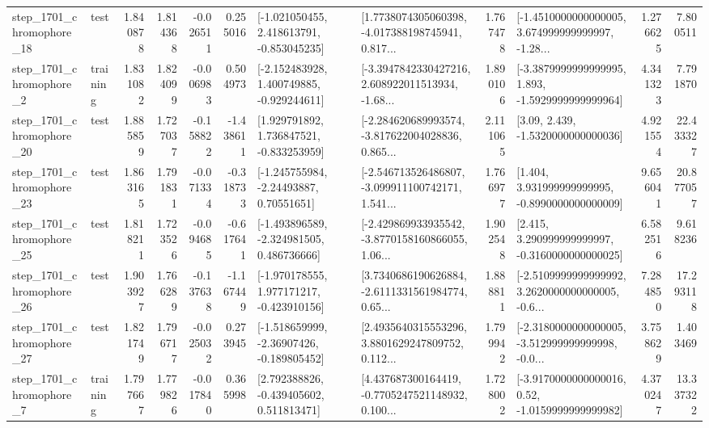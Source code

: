 \begin{tabular}{llrrrrllrlrr}
 step\_1701\_chromophore\_18 &      test &      1.840878 &    1.814368 &     -0.026511 &  0.255016 &   [-1.021050455, 2.418613791, -0.853045235] &  [1.7738074305060398, -4.017388198745941, 0.817... &       1.767478 &  [-1.4510000000000005, 3.674999999999997, -1.28... &            1.276625 &          7.800511 \\
  step\_1701\_chromophore\_2 &  training &      1.831082 &    1.824099 &     -0.006983 &  0.504973 &   [-2.152483928, 1.400749885, -0.929244611] &  [-3.3947842330427216, 2.608922011513934, -1.68... &       1.890106 &  [-3.3879999999999995, 1.893, -1.5929999999999964] &            4.341323 &          7.791870 \\
 step\_1701\_chromophore\_20 &      test &      1.885859 &    1.727037 &     -0.158822 & -1.438611 &    [1.929791892, 1.736847521, -0.833253959] &  [-2.284620689993574, -3.817622004028836, 0.865... &       2.111065 &                 [3.09, 2.439, -1.5320000000000036] &            4.921554 &         22.433327 \\
 step\_1701\_chromophore\_23 &      test &      1.863165 &    1.791831 &     -0.071334 & -0.318733 &     [-1.245755984, -2.24493887, 0.70551651] &  [-2.546713526486807, -3.099911100742171, 1.541... &       1.766977 &    [1.404, 3.931999999999995, -0.8990000000000009] &            9.656041 &         20.877057 \\
 step\_1701\_chromophore\_25 &      test &      1.818211 &    1.723526 &     -0.094685 & -0.617641 &   [-1.493896589, -2.324981505, 0.486736666] &  [-2.429869933935542, -3.8770158160866055, 1.06... &       1.902548 &    [2.415, 3.290999999999997, -0.3160000000000025] &            6.582516 &          9.618236 \\
 step\_1701\_chromophore\_26 &      test &      1.903927 &    1.766289 &     -0.137638 & -1.167449 &   [-1.970178555, 1.977171217, -0.423910156] &  [3.7340686190626884, -2.6111331561984774, 0.65... &       1.888811 &  [-2.5109999999999992, 3.2620000000000005, -0.6... &            7.284850 &         17.293118 \\
 step\_1701\_chromophore\_27 &      test &      1.821749 &    1.796717 &     -0.025032 &  0.273945 &   [-1.518659999, -2.36907426, -0.189805452] &  [2.4935640315553296, 3.8801629247809752, 0.112... &       1.799942 &  [-2.3180000000000005, -3.512999999999998, -0.0... &            3.758629 &          1.403469 \\
  step\_1701\_chromophore\_7 &  training &      1.797667 &    1.779826 &     -0.017840 &  0.365998 &    [2.792388826, -0.439405602, 0.511813471] &  [4.437687300164419, -0.7705247521148932, 0.100... &       1.728002 &   [-3.9170000000000016, 0.52, -1.0159999999999982] &            4.370247 &         13.337322 \\

\end{tabular}
